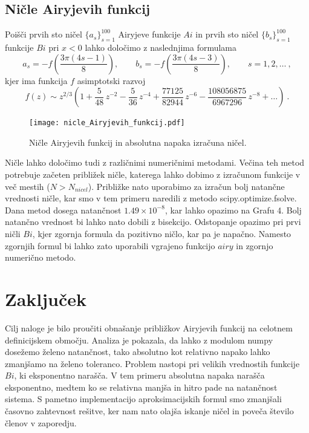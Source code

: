 \documentclass[12pt, a4paper]{article}
\begin{document}
\subsection{Ničle Airyjevih funkcij}
Poišči prvih sto ničel $\{a_s\}_{s=1}^{100}$ Airyjeve
funkcije $Ai$ in prvih sto ničel $\{b_s\}_{s=1}^{100}$
funkcije $Bi$ pri $x<0$ lahko določimo z naslednjima formulama
%
\begin{equation*}
  a_s = - f \left( \frac{3\pi(4s-1)}{8} \right), \qquad
  b_s = - f \left( \frac{3\pi(4s-3)}{8} \right), \qquad s = 1,2,\ldots \>,
\end{equation*}
%
kjer ima funkcija $f$ asimptotski razvoj
%
\begin{equation*}
  f(z) \sim z^{2/3} \left(
  1 + \frac{5}{48} \, z^{-2}
  -\frac{5}{36} \, z^{-4}
  +\frac{77125}{82944} \, z^{-6}
  -\frac{108056875}{6967296} \, z^{-8} + \ldots\right) \>.
\end{equation*}

\begin{figure}[hbtp]
  \begin{center}
  \texttt{[image: nicle\_Airyjevih\_funkcij.pdf]}
  \end{center}
  \vspace*{-7mm}
  \caption{Ničle Airyjevih funkcij in absolutna napaka izračuna ničel.}
\end{figure}

Ničle lahko določimo tudi z različnimi numeričnimi metodami.
Večina teh metod potrebuje začeten približek ničle, katerega lahko dobimo z izračunom funkcije v več mestih ($N > N_{nicel}$). Približke nato uporabimo za izračun bolj natančne vrednosti ničle, kar smo v tem primeru naredili z metodo {\sc scipy.optimize.fsolve}. 
Dana metod dosega natančnost $1.49 \times 10^{-8}$, kar lahko opazimo na Grafu 4. Bolj natančno vrednost bi lahko nato dobili z bisekcijo. Odstopanje opazimo pri prvi ničli $Bi$, kjer zgornja formula da pozitivno ničlo, kar pa je napačno. Namesto zgornjih formul bi lahko zato uporabili vgrajeno funkcijo $airy$ in zgornjo numerično metodo.

\section{Zaključek}
Cilj naloge je bilo proučiti obnašanje približkov Airyjevih funkcij na celotnem definicijskem območju. 
Analiza je pokazala, da lahko z modulom {\sc numpy} dosežemo želeno natančnost, tako absolutno kot relativno napako lahko zmanjšamo na želeno toleranco. Problem nastopi pri velikih vrednostih funkcije $Bi$, ki eksponentno narašča. 
V tem primeru absolutna napaka narašča eksponentno, medtem ko se relativna manjša in hitro pade na natančnost sistema. S pametno implementacijo aproksimacijskih formul smo zmanjšali časovno zahtevnost rešitve, ker nam nato olajša iskanje ničel in poveča število členov v zaporedju. 
\end{document}

